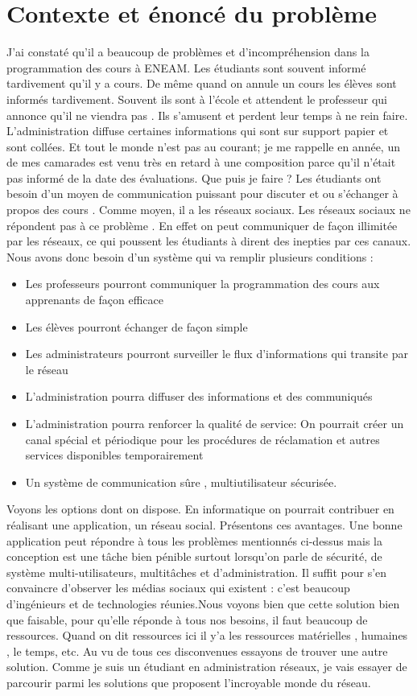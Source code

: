 \documentclass[a4paper,12pt,french]{report} %
\begin{document}
	\section{Contexte et énoncé du problème}	
	J'ai constaté qu'il a beaucoup de problèmes et d'incompréhension dans la programmation des cours à ENEAM. Les étudiants sont souvent informé tardivement qu'il y a cours. De même quand on annule un cours les élèves sont informés tardivement. Souvent ils sont à l'école et attendent le professeur qui annonce qu'il ne viendra pas . Ils s'amusent et perdent leur temps à ne rein faire. L'administration diffuse certaines informations qui sont sur support papier et sont collées. Et tout le monde n'est pas au courant; je me rappelle en \tertio année, un de mes camarades est venu très en retard à une composition parce qu'il n'était pas informé de la date des évaluations. Que puis je faire ? Les étudiants ont besoin d'un moyen de communication puissant pour discuter et ou s'échanger à propos des cours . Comme moyen, il a les réseaux sociaux. Les réseaux sociaux ne répondent pas à ce problème . En effet on peut communiquer de façon illimitée par les réseaux, ce qui poussent les étudiants à dirent des inepties par ces canaux. Nous avons donc besoin d'un système qui va remplir plusieurs conditions :
\begin{itemize}
	\item Les professeurs pourront communiquer la programmation des cours aux apprenants de façon efficace
	\item Les élèves pourront échanger de façon simple
	\item Les administrateurs pourront surveiller le flux d'informations qui transite par le réseau
	\item L'administration pourra diffuser des informations et des communiqués 
	\item L'administration pourra renforcer la qualité de service: On pourrait créer un canal spécial et périodique pour les procédures de réclamation et autres services disponibles temporairement
	\item Un système de communication sûre , multiutilisateur sécurisée. 
\end{itemize}

	Voyons les options dont on dispose. En informatique on pourrait contribuer en réalisant une application, un réseau social.
Présentons ces avantages. Une bonne application peut répondre à tous les problèmes mentionnés ci-dessus mais la conception est une tâche bien pénible surtout lorsqu'on parle de sécurité, de système multi-utilisateurs, multitâches et d'administration. Il suffit pour s'en convaincre d'observer les médias sociaux qui existent : c'est beaucoup d'ingénieurs et de technologies réunies.Nous voyons bien que cette solution bien que faisable, pour qu'elle réponde à tous nos besoins,  il faut beaucoup de ressources. Quand on dit ressources ici il y'a les ressources matérielles , humaines , le temps, etc. Au vu de tous ces disconvenues essayons de trouver une autre solution. Comme je suis un étudiant en administration réseaux, je vais essayer de parcourir parmi les solutions que proposent l'incroyable monde du réseau.
\end{document}
